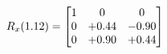 \documentclass[preview]{standalone}
\begin{document}
\begin{align*}
\special{dvisvgm:raw <g id='unique000'>}R_{x}(1.12) = \begin{bmatrix}1 & 0 & 0 \\0 & +0.44 & -0.90 \\0 & +0.90 & +0.44\end{bmatrix}\special{dvisvgm:raw </g>}
\end{align*}
\end{document}
